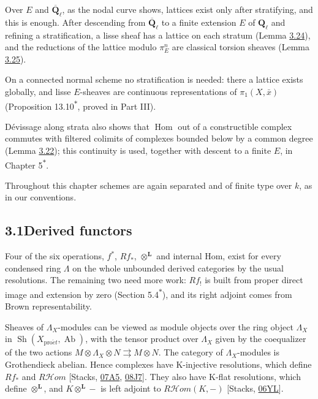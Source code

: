 \documentclass[11pt]{article}
\newcommand{\bpout}[1]{#1\textsuperscript{\hyperlink{bp-outside}{\ensuremath{\ast}}}}
\providecommand{\Hom}{}\renewcommand{\Hom}{\operatorname{Hom}}
\providecommand{\Sh}{}\renewcommand{\Sh}{\operatorname{Sh}}
\providecommand{\cHom}{}\renewcommand{\cHom}{R\mathcal{H}\!om}
\begin{document}
Over \(E\) and \(\overline{\mathbf Q}_\ell\), as the nodal curve shows, lattices exist only after stratifying, and this is enough. After descending from \(\overline{\mathbf Q}_\ell\) to a finite extension \(E\) of \(\mathbf Q_\ell\) and refining a stratification, a lisse sheaf has a lattice on each stratum (Lemma \hyperref[bp77]{3.24}), and the reductions of the lattice modulo \(\pi_E^n\) are classical torsion sheaves (Lemma \hyperref[bp82]{3.25}).

On a connected normal scheme no stratification is needed: there a lattice exists globally, and lisse \(E\)-sheaves are continuous representations of \(\pi_1(X,\bar x)\) (Proposition \bpout{13.10}, proved in Part III).

Dévissage along strata also shows that \(\Hom\) out of a constructible complex commutes with filtered colimits of complexes bounded below by a common degree (Lemma \hyperref[bp68]{3.22}); this continuity is used, together with descent to a finite \(E\), in Chapter \bpout{5}.

Throughout this chapter schemes are again separated and of finite type over \(k\), as in our conventions.

\subsection*{\texorpdfstring{3.1\quad Derived functors}{3.1 Derived functors}}
\label{bp3}%
\label{bp4}%
Four of the six operations, \(f^*\), \(Rf_*\), \(\otimes^{\mathbf L}\) and internal Hom, exist for every condensed ring \(\Lambda\) on the whole unbounded derived categories by the usual resolutions. The remaining two need more work: \(Rf_!\) is built from proper direct image and extension by zero (Section \bpout{5.4}), and its right adjoint comes from Brown representability.

Sheaves of \(\Lambda_X\)-modules can be viewed as module objects over the ring object \(\Lambda_X\) in \(\Sh(X_{\mathrm{pro}\acute{e}t},\operatorname{Ab})\), with the tensor product over \(\Lambda_X\) given by the coequalizer of the two actions \(M\otimes\Lambda_X\otimes N\rightrightarrows M\otimes N\). The category of \(\Lambda_X\)-modules is Grothendieck abelian. Hence complexes have K-injective resolutions, which define \(Rf_*\) and \(\cHom\) [Stacks, \href{https://stacks.math.columbia.edu/tag/07A5}{07A5}, \href{https://stacks.math.columbia.edu/tag/08J7}{08J7}]. They also have K-flat resolutions, which define \(\otimes^{\mathbf L}\), and \(K\otimes^{\mathbf L}-\) is left adjoint to \(\cHom(K,-)\) [Stacks, \href{https://stacks.math.columbia.edu/tag/06YL}{06YL}].
\end{document}
